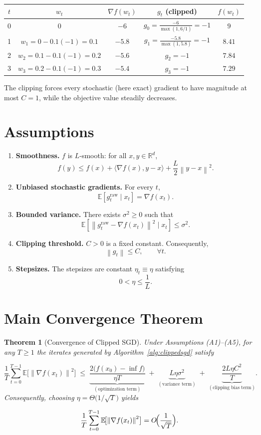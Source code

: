 \documentclass{article}
\newtheorem{theorem}{Theorem}
\newcommand{\E}{\mathbb{E}}
\newcommand{\R}{\mathbb{R}}
\newcommand{\norm}[1]{\left\lVert #1\right\rVert}
\begin{document}
\begin{center}
\begin{tabular}{c|c|c|c|c}
$t$ & $w_t$ & $\nabla f(w_t)$ & $g_t$ (clipped) & $f(w_t)$ \\ \hline
0 & $0$ & $-6$ & $g_0=\frac{-6}{\max(1,6/1)}=-1$ & $9$ \\
1 & $w_1=0-0.1(-1)=0.1$ & $-5.8$ & $g_1=\frac{-5.8}{\max(1,5.8)}=-1$ & $8.41$ \\
2 & $w_2=0.1-0.1(-1)=0.2$ & $-5.6$ & $g_2=-1$ & $7.84$ \\
3 & $w_3=0.2-0.1(-1)=0.3$ & $-5.4$ & $g_3=-1$ & $7.29$
\end{tabular}
\end{center}
The clipping forces every stochastic (here exact) gradient to have magnitude at most $C=1$, while the objective value steadily decreases.

\section*{Assumptions}
\label{sec:assumptions}
\begin{enumerate}
\item \textbf{Smoothness.} $f$ is $L$‑smooth: for all $x,y\in\R^{d}$,
\[
f(y)\le f(x)+\langle\nabla f(x),y-x\rangle+\frac{L}{2}\norm{y-x}^{2}.
\tag{A1}
\]
\item \textbf{Unbiased stochastic gradients.} For every $t$,
\[
\E\!\left[g_t^{\text{raw}}\mid x_t\right]=\nabla f(x_t).
\tag{A2}
\]
\item \textbf{Bounded variance.} There exists $\sigma^{2}\ge0$ such that
\[
\E\!\left[\norm{g_t^{\text{raw}}-\nabla f(x_t)}^{2}\mid x_t\right]\le\sigma^{2}.
\tag{A3}
\]
\item \textbf{Clipping threshold.} $C>0$ is a fixed constant. Consequently,
\[
\norm{g_t}\le C,\qquad\forall t.
\tag{A4}
\]
\item \textbf{Stepsizes.} The stepsizes are constant $\eta_t\equiv\eta$ satisfying
\[
0<\eta\le\frac{1}{L}.
\tag{A5}
\]
\end{enumerate}

\section*{Main Convergence Theorem}
\begin{theorem}[Convergence of Clipped SGD]\label{thm:main}
Under Assumptions (A1)–(A5), for any $T\ge1$ the iterates generated by Algorithm~\ref{alg:clippedsgd} satisfy  

\[
\frac{1}{T}\sum_{t=0}^{T-1}\E\!\bigl[\norm{\nabla f(x_t)}^{2}\bigr]
\;\le\;
\underbrace{\frac{2\bigl(f(x_0)-\inf f\bigr)}{\eta T}}_{(\text{optimization term})}
\;+\;
\underbrace{L\eta\sigma^{2}}_{(\text{variance term})}
\;+\;
\underbrace{\frac{2L\eta C^{2}}{T}}_{(\text{clipping bias term})}.
\tag{4}
\]
Consequently, choosing $\eta=\Theta\!\bigl(1/\sqrt{T}\bigr)$ yields  

\[
\frac{1}{T}\sum_{t=0}^{T-1}\E\!\bigl[\norm{\nabla f(x_t)}^{2}\bigr]=
O\!\Bigl(\frac{1}{\sqrt{T}}\Bigr).
\]
\end{theorem}
\end{document}
